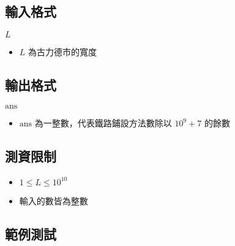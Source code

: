 \subsection{輸入格式}

\begin{format}
\f{
$L$
}
\end{format}

\begin{itemize}
\tightlist
\item
  \begin{math}L\end{math} 為古力德市的寬度
\end{itemize}

\subsection{輸出格式}

\begin{format}
\f{
$\textrm{ans}$
}
\end{format}

\begin{itemize}
\tightlist
\item
  \begin{math}\textrm{ans}\end{math} 為一整數，代表鐵路鋪設方法數除以
  \begin{math}10^9+7\end{math} 的餘數
\end{itemize}

\subsection{測資限制}

\begin{itemize}
\tightlist
\item
  \begin{math}1 \le L \le 10^{10}\end{math}
\item
  輸入的數皆為整數
\end{itemize}

\subsection{範例測試}

\begin{example}
%
%
%
\end{example}

